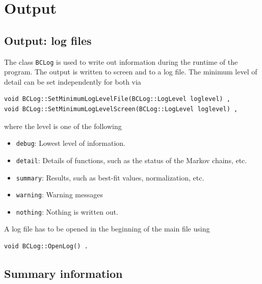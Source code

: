 \documentclass[11pt, a4paper]{article}
\begin{document}

\section{Output}
\label{section:output}

\subsection{Output: log files}
\label{subsection:output}

The class \verb|BCLog| is used to write out information during the
runtime of the program. The output is written to screen and to a log
file. The minimum level of detail can be set independently for both
via
%
\begin{verbatim} 
void BCLog::SetMinimumLogLevelFile(BCLog::LogLevel loglevel) , 
void BCLog::SetMinimumLogLevelScreen(BCLog::LogLevel loglevel) , 
\end{verbatim} 
%
\noindent 
where the level is one of the following 
%
\begin{itemize} 
\item \verb|debug|: Lowest level of information. 
\item \verb|detail|: Details of functions, such as the status of the
  Markov chains, etc.
\item \verb|summary|: Results, such as best-fit values, normalization, etc. 
\item \verb|warning|: Warning messages 
\item \verb|nothing|: Nothing is written out. 
\end{itemize} 

A log file has to be opened in the beginning of the main file using
%
\begin{verbatim} 
void BCLog::OpenLog() . 
\end{verbatim} 


\subsection{Summary information}
\end{document}
